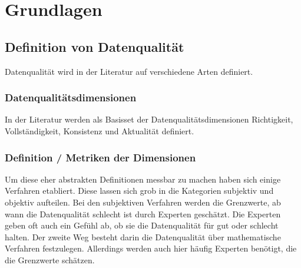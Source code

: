 \chapter{Grundlagen}\label{ch:data}

\section{Definition von Datenqualität}
Datenqualität wird in der Literatur auf verschiedene Arten definiert. 

\subsection{Datenqualitätsdimensionen}
In der Literatur werden als Basisset der Datenqualitätsdimensionen Richtigkeit, Vollständigkeit, Konsistenz und Aktualität definiert. \cite{scannapieco2002}

\subsection{Definition / Metriken der Dimensionen}
Um diese eher abstrakten Definitionen messbar zu machen haben sich einige Verfahren etabliert.
Diese lassen sich grob in die Kategorien subjektiv und objektiv aufteilen. \cite{pipino2002}
Bei den subjektiven Verfahren werden die Grenzwerte, ab wann die Datenqualität schlecht ist durch Experten geschätzt. 
Die Experten geben oft auch ein Gefühl ab, ob sie die Datenqualität für gut oder schlecht halten.
Der zweite Weg besteht darin die Datenqualität über mathematische Verfahren festzulegen.
Allerdings werden auch hier häufig Experten benötigt, die die Grenzwerte schätzen.
